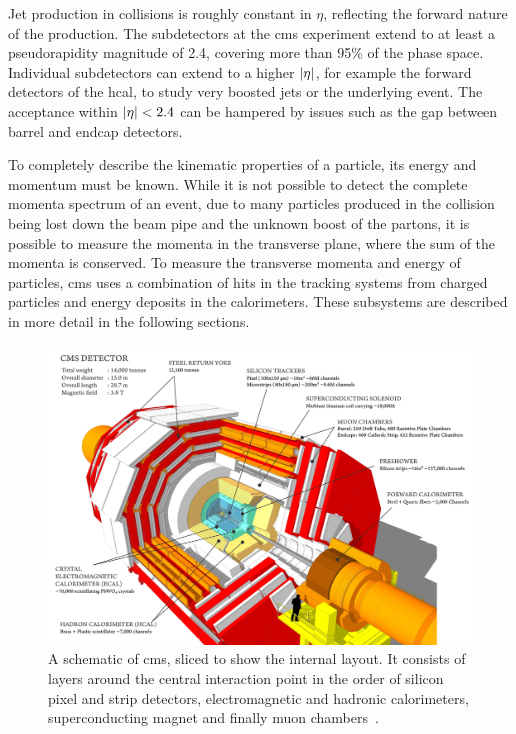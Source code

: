 Jet production in \pp{} collisions is roughly constant in $\eta$, reflecting the forward nature of the production.
The subdetectors at the \acrshort{cms} experiment extend to at least a pseudorapidity magnitude of 2.4, covering more than 95\% of the phase space. 
Individual subdetectors can extend to a higher $\lvert \eta \rvert$, for example the forward detectors of the \acrshort{hcal}, to study very boosted jets or the underlying event.
The acceptance within $\lvert \eta \rvert < 2.4$ can be hampered by issues such as the gap between barrel and endcap detectors.

To completely describe the kinematic properties of a particle, its energy and momentum must be known. 
While it is not possible to detect the complete momenta spectrum of an event, due to many particles produced in the collision being lost down the beam pipe and the unknown boost of the partons, it is possible to measure the momenta in the transverse plane, where the sum of the momenta is conserved. 
To measure the transverse momenta and energy of particles, \acrshort{cms} uses a combination of hits in the tracking systems from charged particles and energy deposits in the calorimeters.
These subsystems are described in more detail in the following sections.

\begin{figure}[htpb]
	\centering
	\includegraphics[width=\linewidth]{Figures/CMSPicture}
	\caption[A schematic of \acrshort{cms}, sliced to show the internal layout. It consists of layers around the central interaction point in the order of silicon pixel and strip detectors, electromagnetic and hadronic calorimeters, superconducting magnet and finally muon chambers. ]{A schematic of \acrshort{cms}, sliced to show the internal layout. It consists of layers around the central interaction point in the order of silicon pixel and strip detectors, electromagnetic and hadronic calorimeters, superconducting magnet and finally muon chambers~\cite{CMSPicture}.}
	\label{fig:CMSPicture}
\end{figure}

